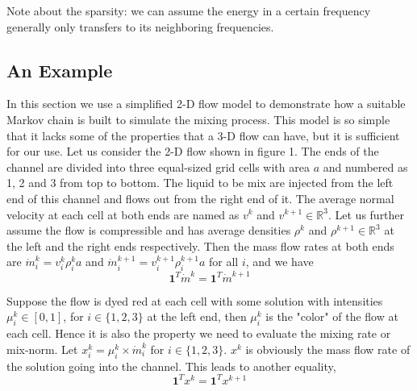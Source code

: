 Note about the sparsity: we can assume the energy in a certain frequency generally only transfers to its neighboring frequencies. 

\subsection{An Example}
In this section we use a simplified 2-D flow model to demonstrate how a suitable Markov chain is built to simulate the mixing process. This model is so simple that it lacks some of the properties that a 3-D flow can have, but it is sufficient for our use.
Let us consider the 2-D flow shown in figure 1. The ends of the channel are divided into three equal-sized grid cells with area $a$ and numbered as 1, 2 and 3 from top to bottom. The liquid to be mix are injected from the left end of this channel and flows out from the right end of it. The average normal velocity at each cell at both ends are named as $v^{k}$ and $v^{k+1} \in \mathbb{R}^3$. Let us further assume the flow is compressible and has average densities $\rho^{k}$ and $\rho^{k+1} \in \mathbb{R}^3$ at the left and the right ends respectively. Then the mass flow rates at both ends are $\dot{m}_i^{k} = v^{k}_i \rho^{k}_i a$ and  $\dot{m}_i^{k+1} = v^{k+1}_i \rho^{k+1}_i a$ for all $i$, and we have
   $$\mathbf{1}^T\dot{m}^{k}=\mathbf{1}^T\dot{m}^{k+1} $$ 


Suppose the flow is dyed red at each cell with some solution with intensities $\mu^{k}_i\in [0,1]$, for $i \in \{1,2,3\}$ at the left end, then $\mu^{k}_i$ is the "color" of the flow at each cell. Hence it is also the property we need to evaluate the mixing rate or mix-norm. Let $x_i^{k} = \mu_i^{k} \times \dot{m}_i^{k}$ for $i \in \{1,2,3\}$. $x^{k}$ is obviously the mass flow rate of the solution going into the channel. This leads to another equality,
  $$\mathbf{1}^T x^{k} =\mathbf{1}^T x^{k+1} $$ 

